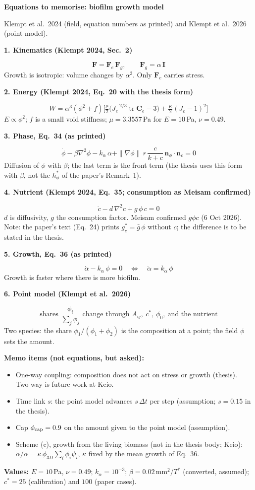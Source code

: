 \documentclass[10pt,a4paper]{ltjsarticle}
\newcommand{\eq}[2]{\par\vspace{4pt}\textbf{#1}\par\[#2\]}
\begin{document}
{\Large\bfseries Equations to memorise: biofilm growth model}\par
{\small Klempt et al.\ 2024 (field, equation numbers as printed) and Klempt et al.\ 2026 (point model).}

\eq{1. Kinematics (Klempt 2024, Sec.\ 2)}{\mathbf F=\mathbf F_e\,\mathbf F_g,\qquad \mathbf F_g=\alpha\,\mathbf I}
Growth is isotropic: volume changes by $\alpha^3$. Only $\mathbf F_e$ carries stress.

\eq{2. Energy (Klempt 2024, Eq.\ 20 with the thesis form)}{W=\alpha^3(\phi^2+f)\Big[\tfrac{\mu}{2}\big(J_e^{-2/3}\operatorname{tr}\mathbf C_e-3\big)+\tfrac{K}{2}(J_e-1)^2\Big]}
$E\propto\phi^2$; $f$ is a small void stiffness; $\mu=3.3557$\,Pa for $E=10$\,Pa, $\nu=0.49$.

\eq{3. Phase, Eq.\ 34 (as printed)}{\dot\phi-\beta\nabla^2\phi-k_\alpha\,\alpha+\|\nabla\phi\|\,r\,\frac{c}{k+c}\,\mathbf n_\phi\!\cdot\!\mathbf n_c=0}
Diffusion of $\phi$ with $\beta$; the last term is the front term (the thesis uses this form with $\beta$, not the $h^*_\phi$ of the paper's Remark~1).

\eq{4. Nutrient (Klempt 2024, Eq.\ 35; consumption as Meisam confirmed)}{\dot c-d\,\nabla^2 c+g\,\phi\,c=0}
$d$ is diffusivity, $g$ the consumption factor. Meisam confirmed $g\phi c$ (6 Oct 2026). Note: the paper's text (Eq.\ 24) prints $g^*_c=\bar g\,\phi$ without $c$; the difference is to be stated in the thesis.

\eq{5. Growth, Eq.\ 36 (as printed)}{\dot\alpha-k_\alpha\,\phi=0\quad\Longleftrightarrow\quad \dot\alpha=k_\alpha\,\phi}
Growth is faster where there is more biofilm.

\eq{6. Point model (Klempt et al.\ 2026)}{\text{shares }\frac{\phi_i}{\sum_j\phi_j}\text{ change through }A_{ij},\ c^*,\ \phi_0,\ \text{and the nutrient}}
Two species: the share $\phi_1/(\phi_1+\phi_2)$ is the composition at a point; the field $\phi$ sets the amount.

\vspace{4pt}
{\bfseries Memo items (not equations, but asked):}
\begin{itemize}
\item One-way coupling: composition does not act on stress or growth (thesis). Two-way is future work at Keio.
\item Time link $s$: the point model advances $s\,\Delta t$ per step (assumption; $s=0.15$ in the thesis).
\item Cap $\phi_{\rm cap}=0.9$ on the amount given to the point model (assumption).
\item Scheme (c), growth from the living biomass (not in the thesis body; Keio): $\dot\alpha/\alpha=\kappa\,\phi_{3D}\sum_i\phi_i\psi_i$, $\kappa$ fixed by the mean growth of Eq.\ 36.
\end{itemize}
\textbf{Values:} $E=10$\,Pa, $\nu=0.49$; $k_\alpha=10^{-3}$; $\beta=0.02$\,mm$^2$/$T^*$ (converted, assumed); $c^*=25$ (calibration) and $100$ (paper cases).
\end{document}
